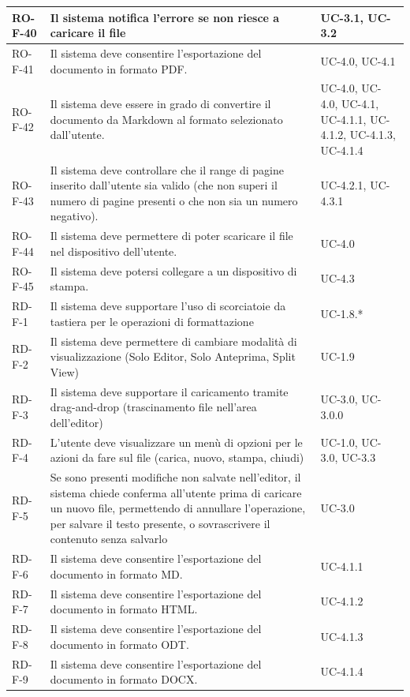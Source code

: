 \documentclass[11pt,a4paper]{article}
\begin{document}
\begin{longtable}{|p{}|>{\raggedright\arraybackslash}p{}|p{}|}
RO-F-40 & Il sistema notifica l'errore se non riesce a caricare il file & UC-3.1, UC-3.2\\
\hline
RO-F-41 & Il sistema deve consentire l'esportazione del documento in formato PDF. & UC-4.0, UC-4.1\\
\hline
RO-F-42 & Il sistema deve essere in grado di convertire il documento da Markdown al formato selezionato dall'utente. & UC-4.0, UC-4.0, UC-4.1, UC-4.1.1, UC-4.1.2, UC-4.1.3, UC-4.1.4\\
\hline
RO-F-43 & Il sistema deve controllare che il range di pagine inserito dall'utente sia valido (che non superi il numero di pagine presenti o che non sia un numero negativo). & UC-4.2.1, UC-4.3.1\\
\hline
RO-F-44 & Il sistema deve permettere di poter scaricare il file nel dispositivo dell'utente. & UC-4.0\\
\hline
RO-F-45 & Il sistema deve potersi collegare a un dispositivo di stampa. & UC-4.3\\
\hline
RD-F-1 & Il sistema deve supportare l'uso di scorciatoie da tastiera per le operazioni di formattazione & UC-1.8.* \\
\hline
RD-F-2 & Il sistema deve permettere di cambiare modalità di visualizzazione (Solo Editor, Solo Anteprima, Split View) & UC-1.9 \\
\hline
RD-F-3 & Il sistema deve supportare il caricamento tramite drag-and-drop (trascinamento file nell'area dell'editor) & UC-3.0, UC-3.0.0 \\
\hline
RD-F-4 & L'utente deve visualizzare un menù di opzioni per le azioni da fare sul file (carica, nuovo, stampa, chiudi) & UC-1.0, UC-3.0, UC-3.3 \\
\hline
RD-F-5 & Se sono presenti modifiche non salvate nell'editor, il sistema chiede conferma all'utente prima di caricare un nuovo file, permettendo di annullare l'operazione, per salvare il testo presente, o sovrascrivere il contenuto senza salvarlo & UC-3.0 \\
\hline
RD-F-6 & Il sistema deve consentire l'esportazione del documento in formato MD. & UC-4.1.1 \\
\hline
RD-F-7 & Il sistema deve consentire l'esportazione del documento in formato HTML. & UC-4.1.2 \\
\hline
RD-F-8 & Il sistema deve consentire l'esportazione del documento in formato ODT. & UC-4.1.3 \\
\hline
RD-F-9 & Il sistema deve consentire l'esportazione del documento in formato DOCX. & UC-4.1.4 \\

\end{longtable}
\end{document}
